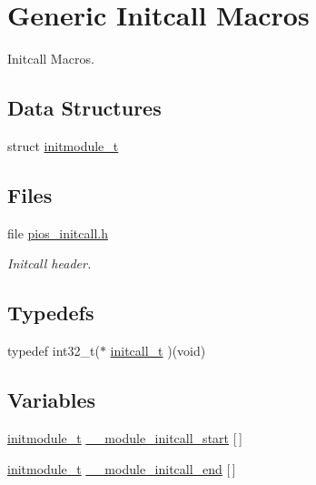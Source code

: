 \hypertarget{group___p_i_o_s___i_n_i_t_c_a_l_l}{\section{\-Generic \-Initcall \-Macros}
\label{group___p_i_o_s___i_n_i_t_c_a_l_l}
}


\-Initcall \-Macros.  


\subsection*{\-Data \-Structures}
\begin{DoxyCompactItemize}
\item 
struct \hyperlink{structinitmodule__t}{initmodule\-\_\-t}
\end{DoxyCompactItemize}
\subsection*{\-Files}
\begin{DoxyCompactItemize}
\item 
file \hyperlink{pios__initcall_8h}{pios\-\_\-initcall.\-h}
\begin{DoxyCompactList}\small\item\em \-Initcall header. \end{DoxyCompactList}\end{DoxyCompactItemize}
\subsection*{\-Typedefs}
\begin{DoxyCompactItemize}
\item 
typedef int32\-\_\-t($\ast$ \hyperlink{group___p_i_o_s___i_n_i_t_c_a_l_l_ga4f58a033b271ad632c4583977de7e3c0}{initcall\-\_\-t} )(void)
\end{DoxyCompactItemize}
\subsection*{\-Variables}
\begin{DoxyCompactItemize}
\item 
\hyperlink{structinitmodule__t}{initmodule\-\_\-t} \hyperlink{group___p_i_o_s___i_n_i_t_c_a_l_l_gaa34043b309a5d9e66ea205addc66701d}{\-\_\-\-\_\-module\-\_\-initcall\-\_\-start} \mbox{[}$\,$\mbox{]}
\item 
\hyperlink{structinitmodule__t}{initmodule\-\_\-t} \hyperlink{group___p_i_o_s___i_n_i_t_c_a_l_l_ga6b38c970a2c1607f469526ed3c8b6aaa}{\-\_\-\-\_\-module\-\_\-initcall\-\_\-end} \mbox{[}$\,$\mbox{]}
\end{DoxyCompactItemize}


